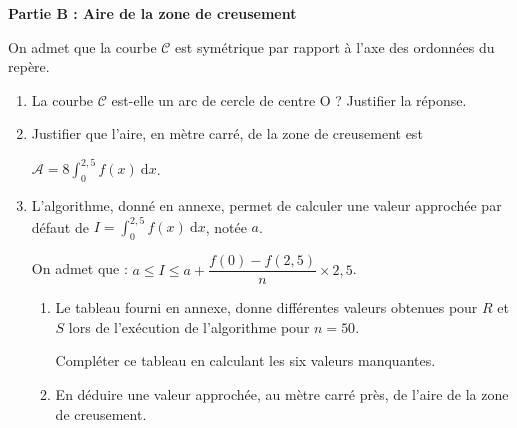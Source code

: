 \documentclass[10pt]{article}
\begin{document}
\textbf{Partie B : Aire de la zone de creusement}

\medskip 

On admet que la courbe $\mathcal{C}$ est symétrique par rapport à l'axe des ordonnées du repère. 

\medskip

\begin{enumerate}
\item La courbe $\mathcal{C}$ est-elle un arc de cercle de centre O ? Justifier la réponse.
\item Justifier que l'aire, en mètre carré, de la zone de creusement est 

$\mathcal{A} = 8\displaystyle\int_0^{2,5}  f(x)\:\text{d}x$. 
\item L'algorithme, donné en annexe, permet de calculer une valeur approchée par défaut de $I = \displaystyle\int_0^{2,5}  f(x)\:\text{d}x$, notée $a$. 

On admet que : $a \leqslant  I \leqslant a + \dfrac{f(0) - f(2,5)}{n}\times  2,5$. 

	\begin{enumerate}
		\item Le tableau fourni en annexe, donne différentes valeurs obtenues pour $R$ et $S$ lors de l'exécution de l'algorithme pour $n = 50$. 

Compléter ce tableau en calculant les six valeurs manquantes. 
		\item En déduire une valeur approchée, au mètre carré près, de l'aire de la zone de creusement. 
	\end{enumerate}
\end{enumerate}
\end{document}
